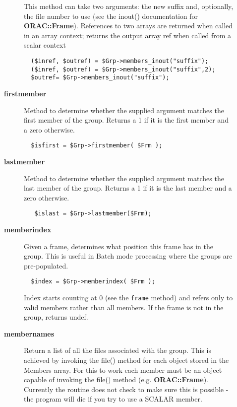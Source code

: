 \begin{description}
\begin{description}
This method can take two arguments: the new suffix and, optionally,
the file number to use (see the inout() documentation for
\textbf{ORAC::Frame}). References to two arrays are returned when called
in an array context; returns the output array ref when called
from a scalar context

\begin{verbatim}
  ($inref, $outref) = $Grp->members_inout("suffix");
  ($inref, $outref) = $Grp->members_inout("suffix",2);
  $outref= $Grp->members_inout("suffix");
\end{verbatim}

\item[{\textbf{firstmember}}] \mbox{}

Method to determine whether the supplied argument matches the first
member of the group. Returns a 1 if it is the first member and a zero
otherwise.

\begin{verbatim}
  $isfirst = $Grp->firstmember( $Frm );
\end{verbatim}

\item[{\textbf{lastmember}}] \mbox{}

Method to determine whether the supplied argument
matches the last member of the group. Returns a 1 if
it is the last member and a zero otherwise.

\begin{verbatim}
   $islast = $Grp->lastmember($Frm);
\end{verbatim}

\item[{\textbf{memberindex}}] \mbox{}

Given a frame, determines what position this frame has in the
group. This is useful in Batch mode processing where the
groups are pre-populated.

\begin{verbatim}
  $index = $Grp->memberindex( $Frm );
\end{verbatim}


Index starts counting at 0 (see the \texttt{frame} method)
and refers only to valid members rather than all members.
If the frame is not in the group, returns undef.


\item[{\textbf{membernames}}] \mbox{}

Return a list of all the files associated with the group. This is
achieved by invoking the file() method for each object stored in the
Members array.  For this to work each member must be an object capable
of invoking the file() method (e.g. \textbf{ORAC::Frame}). Currently the
routine does not check to make sure this is possible - the program
will die if you try to use a SCALAR member.




\end{description}
\end{description}
